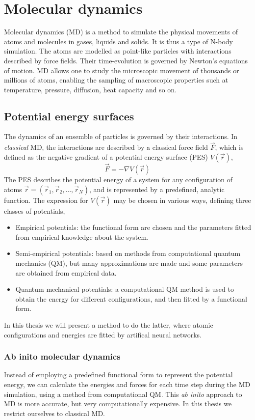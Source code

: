 \documentclass[twoside,english]{uiofysmaster}
\begin{document}
\chapter{Molecular dynamics}
Molecular dynamics (MD) is a method to simulate the physical movements of atoms and molecules in gases, liquids and solids. 
It is thus a type of N-body simulation. The atoms are modelled as point-like particles with interactions described
by force fields. Their time-evolution is governed by Newton's equations of motion. MD allows one to study the microscopic
movement of thousands or millions of atoms, enabling the sampling of macroscopic properties such at temperature, pressure, 
diffusion, heat capacity and so on. 

\section{Potential energy surfaces} \label{sec:potentialEnergySurfaces}
The dynamics of an ensemble of particles is governed by their interactions. 
In \textit{classical} MD, the interactions are described
by a classical force field $\vec{F}$, which is defined as the negative gradient of a potential energy surface (PES) $V(\vec{r})$,
\begin{equation}
 \vec{F} = -\nabla V(\vec{r})
 \label{forcePES}
\end{equation}
The PES describes the potential energy of a system for any configuration of atoms 
$\vec{r} = (\vec{r}_1, \vec{r}_2, \dots, \vec{r}_N)$, and is represented by a predefined, analytic function. 
The expression for $V(\vec{r})$ may be chosen in various ways, defining three classes of potentials,
\begin{itemize}
 \item Empirical potentials: the functional form are chosen and the parameters fitted from 
 empirical knowledge about the system.
 \item Semi-empirical potentials: based on methods from computational quantum mechanics (QM), but many approximations
 are made and some parameters are obtained from empirical data. 
 \item Quantum mechanical potentials: a computational QM method 
 is used to obtain the energy for different configurations, and then fitted by a functional form.
\end{itemize}
In this thesis we will present a method to do the latter, where atomic configurations and energies are fitted
by artifical neural networks. 

\subsection*{Ab inito molecular dynamics}
Instead of employing a predefined functional form to represent the potential energy, we can 
calculate the energies and forces for each time step during the MD simulation, using a method from 
computational QM. This \textit{ab inito} approach to MD is more accurate, but very computationally expensive. 
In this thesis we restrict ourselves to classical MD. 
\end{document}
